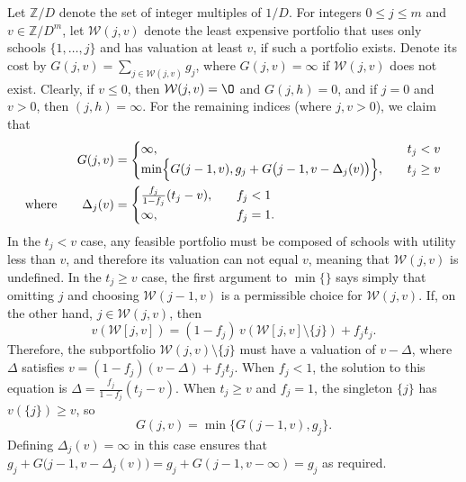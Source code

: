 \documentclass[11pt]{article} %
\theoremstyle{definition}
\begin{document}
Let $\mathbb{Z}/D$ denote the set of integer multiples of $1/D$. For integers $0 \leq j \leq m$ and $v \in \mathbb{Z}/{D^m}$, let $\mathcal{W}(j, v)$ denote the least expensive portfolio that uses only schools $\{ 1, \dots, j\}$ and has valuation at least $v$, if such a portfolio exists. Denote its cost by $G(j, v) = \sum_{j\in \mathcal{W}(j, v)} g_j$, where $G(j, v) = \infty$ if $\mathcal{W}(j, v)$ does not exist. Clearly, if $v \leq 0$, then $\mathcal{W}(j, v) = \O$ and $G(j, h) = 0$, and if $j = 0$ and $v > 0$, then $(j, h) = \infty$.  For the remaining indices (where $j, v > 0$), we claim that
\begin{align} \label{recursionrelationforcostmindp}
G(j, v) &=
\begin{cases}
\infty, \quad & t_j < v \\
\min\Bigl\{G(j-1, v), g_j + G\bigl(j-1, v - \Delta_j(v)\bigr) \Bigr\}, \quad & t_j \geq v 
\end{cases}\\
\text{where}\qquad
\Delta_j (v) &= 
\begin{cases}
\frac{f_j}{1 - f_j} (t_j - v), \quad & f_j < 1\\
\infty, &f_j = 1.
\end{cases} \label{deltajvdef}
\end{align}
In the $t_j < v$ case, any feasible portfolio must be composed of schools with utility less than $v$, and therefore its valuation can not equal $v$, meaning that $\mathcal{W}(j, v)$ is undefined. In the $t_j \geq v$ case, the first argument to $\min\{\}$ says simply that omitting $j$ and choosing $\mathcal{W}(j-1, v)$ is a permissible choice for $\mathcal{W}(j, v)$. If, on the other hand, $j \in \mathcal{W}(j, v)$, then
\begin{equation} \label{solvemeforvwjvminusj}
v(\mathcal{W}[j, v]) = (1 - f_j )\,v(\mathcal{W}[j, v]\setminus \{j\}) + f_j t_j.
\end{equation}
Therefore, the subportfolio $\mathcal{W}(j, v)\setminus \{j\}$ must have a valuation of $v - \Delta$, where $\Delta$ satisfies $v = (1 - f_j )(v - \Delta) + f_j t_j $. When $f_j < 1$, the solution to this equation is $ \Delta = \frac{f_j}{1 - f_j} (t_j - v)$. When $t_j \geq v$ and $f_j = 1$, the singleton $\{j\}$ has $v(\{j\}) \geq v$, so
\begin{equation}G(j, v) = \min\bigl\{G(j-1, v), g_j \bigr\}.\end{equation}
Defining $\Delta_j(v) = \infty$ in this case ensures that $g_j + G\bigl(j-1, v-\Delta_j(v)\bigr) = g_j+ G(j-1, v-\infty) = g_j $ as required.
\end{document}
